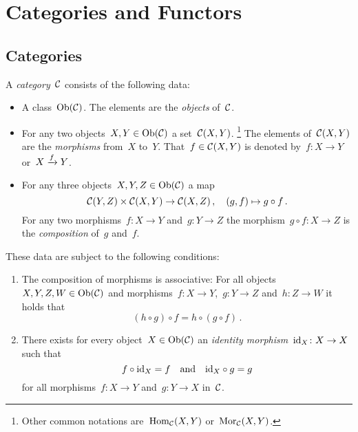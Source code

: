 \chapter{Categories and Functors}










\section{Categories}

\begin{definition}
  A \emph{category}~$\mathcal{C}$ consists of the following data:
  \begin{itemize}
    \item
      A class~$\operatorname{Ob}(\mathcal{C})$.
      The elements are the \emph{objects} of~$\mathcal{C}$.
    \item
      For any two objects~$X, Y \in \operatorname{Ob}(\mathcal{C})$ a set~$\mathcal{C}(X,Y)$.%
      \footnote{Other common notations are~$\operatorname{Hom}_{\mathcal{C}}(X,Y)$ or~$\operatorname{Mor}_{\mathcal{C}}(X,Y)$.}
      The elements of~$\mathcal{C}(X, Y)$ are the \emph{morphisms} from~$X$ to~$Y$.
      That~$f \in \mathcal{C}(X,Y)$ is denoted by~$f \colon X \to Y$ or~$X \xrightarrow{f} Y$.
    \item
      For any three objects~$X, Y, Z \in \operatorname{Ob}(\mathcal{C})$ a map
      \[
                \mathcal{C}(Y,Z) \times \mathcal{C}(X,Y)
        \to     \mathcal{C}(X,Z) \,,
        \quad   (g, f)
        \mapsto g \circ f \,.
      \]
      For any two morphisms~$f \colon X \to Y$ and~$g \colon Y \to Z$ the morphism~$g \circ f \colon X \to Z$ is the \emph{composition} of~$g$ and~$f$.
  \end{itemize}
  These data are subject to the following conditions:
  \begin{enumerate}[label=(C\arabic*)]
    \item
      The composition of morphisms is associative:
      For all objects~$X, Y, Z, W \in \operatorname{Ob}(\mathcal{C})$ and morphisms~$f \colon X \to Y$,~$g \colon Y \to Z$ and~$h \colon Z \to W$ it holds that
      \[
          (h \circ g) \circ f
        = h \circ (g \circ f) \,.
      \]
    \item
      There exists for every object~$X \in \operatorname{Ob}(\mathcal{C})$ an \emph{identity morphism}~$\mathrm{id}_X \colon X \to X$ such that
      \[
        f \circ \mathrm{id}_X = f
        \quad\text{and}\quad
        \mathrm{id}_X \circ g = g
      \]
      for all morphisms~$f \colon X \to Y$ and~$g \colon Y \to X$ in~$\mathcal{C}$.
  \end{enumerate}
\end{definition}



